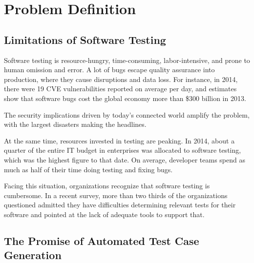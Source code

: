 \iffalse
\section{Problem Definition}

\subsection{Limitations of Software Testing}


Software testing is resource-hungry, time-consuming, labor-intensive, and prone to human omission and error.  A lot of bugs escape quality assurance into production, where they cause disruptions and data loss. For instance, in 2014, there were 19 CVE vulnerabilities reported on average per day, and estimates show that software bugs cost the global economy more than \$300 billion in 2013.

The security implications driven by today's connected world amplify the problem, with the largest disasters making the headlines.

At the same time, resources invested in testing are peaking. In 2014, about a quarter of the entire IT budget in enterprises was allocated to software testing, which was the highest figure to that date.  On average, developer teams spend as much as half of their time doing testing and fixing bugs.

Facing this situation, organizations recognize that software testing is cumbersome.  In a recent survey, more than two thirds of the organizations questioned admitted they have difficulties determining relevant tests for their software and pointed at the lack of adequate tools to support that.

\subsection{The Promise of Automated Test Case Generation}


